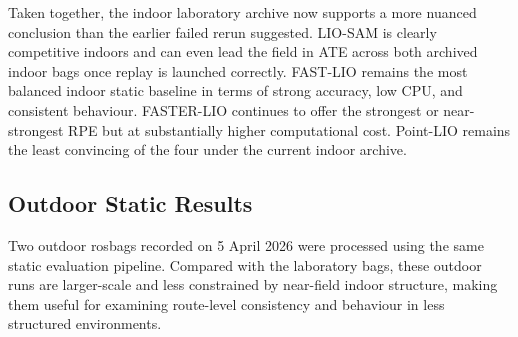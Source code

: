 \documentclass[12pt,a4paper]{report}
\begin{document}
Taken together, the indoor laboratory archive now supports a more nuanced conclusion than the earlier failed rerun suggested. LIO-SAM is clearly competitive indoors and can even lead the field in ATE across both archived indoor bags once replay is launched correctly. FAST-LIO remains the most balanced indoor static baseline in terms of strong accuracy, low CPU, and consistent behaviour. FASTER-LIO continues to offer the strongest or near-strongest RPE but at substantially higher computational cost. Point-LIO remains the least convincing of the four under the current indoor archive.

\subsection{Outdoor Static Results}
Two outdoor rosbags recorded on 5 April 2026 were processed using the same static evaluation pipeline. Compared with the laboratory bags, these outdoor runs are larger-scale and less constrained by near-field indoor structure, making them useful for examining route-level consistency and behaviour in less structured environments.

\begin{table}[H]
\centering
\small
\caption{Outdoor static rosbag results.}
\label{tab:static-outdoor}
\setlength{\tabcolsep}{4pt}
\renewcommand{\arraystretch}{1.05}
\end{table}
\end{document}
